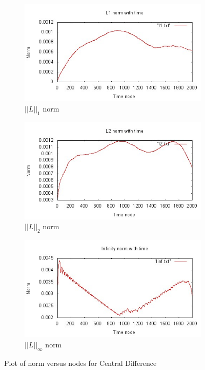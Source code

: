 \documentclass[a4paper,12pt]{report}
\begin{document}
\begin{figure}[h!]  
	\centering
	\begin{subfigure}[b]{0.7\textwidth}
		\includegraphics[width=\textwidth]{l1.jpeg}
                \caption{$||L||_1$ norm}
                \label{fig:l1}
	\end{subfigure}
	\begin{subfigure}[b]{0.7\textwidth}
		\includegraphics[width=\textwidth]{l2.jpeg}
                \caption{$||L||_2$ norm}
                \label{fig:l2}
	\end{subfigure}
	\begin{subfigure}[b]{0.7\textwidth}
		\includegraphics[width=\textwidth]{linf.jpeg}
                \caption{$||L||_{\infty}$ norm}
                \label{fig:linf}
	\end{subfigure}
	\caption{Plot of norm versus nodes for Central Difference}
	\label{Normscd}
\end{figure}
\end{document}
